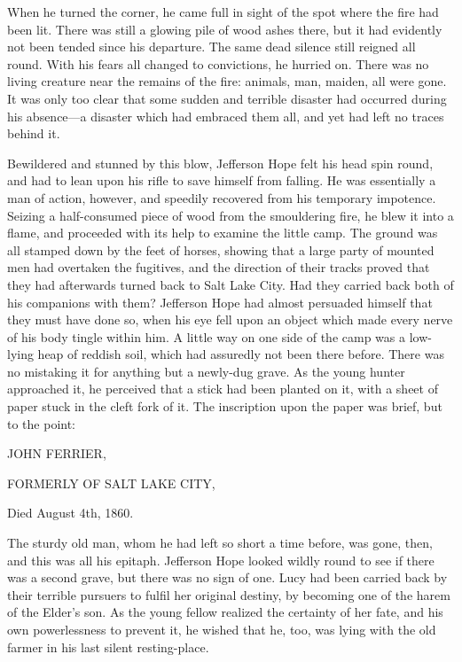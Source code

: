 \documentclass[12pt]{book}
\begin{document}
When he turned the corner, he came full in sight of the spot where the fire had been lit. There was still a glowing pile of wood ashes there, but it had evidently not been tended since his departure. The same dead silence still reigned all round. With his fears all changed to convictions, he hurried on. There was no living creature near the remains of the fire: animals, man, maiden, all were gone. It was only too clear that some sudden and terrible disaster had occurred during his absence—a disaster which had embraced them all, and yet had left no traces behind it. 

Bewildered and stunned by this blow, Jefferson Hope felt his head spin round, and had to lean upon his rifle to save himself from falling. He was essentially a man of action, however, and speedily recovered from his temporary impotence. Seizing a half-consumed piece of wood from the smouldering fire, he blew it into a flame, and proceeded with its help to examine the little camp. The ground was all stamped down by the feet of horses, showing that a large party of mounted men had overtaken the fugitives, and the direction of their tracks proved that they had afterwards turned back to Salt Lake City. Had they carried back both of his companions with them? Jefferson Hope had almost persuaded himself that they must have done so, when his eye fell upon an object which made every nerve of his body tingle within him. A little way on one side of the camp was a low-lying heap of reddish soil, which had assuredly not been there before. There was no mistaking it for anything but a newly-dug grave. As the young hunter approached it, he perceived that a stick had been planted on it, with a sheet of paper stuck in the cleft fork of it. The inscription upon the paper was brief, but to the point: 

                        JOHN FERRIER,

                 FORMERLY OF SALT LAKE CITY,

                    Died August 4th, 1860.

The sturdy old man, whom he had left so short a time before, was gone, then, and this was all his epitaph. Jefferson Hope looked wildly round to see if there was a second grave, but there was no sign of one. Lucy had been carried back by their terrible pursuers to fulfil her original destiny, by becoming one of the harem of the Elder’s son. As the young fellow realized the certainty of her fate, and his own powerlessness to prevent it, he wished that he, too, was lying with the old farmer in his last silent resting-place. 
\end{document}
